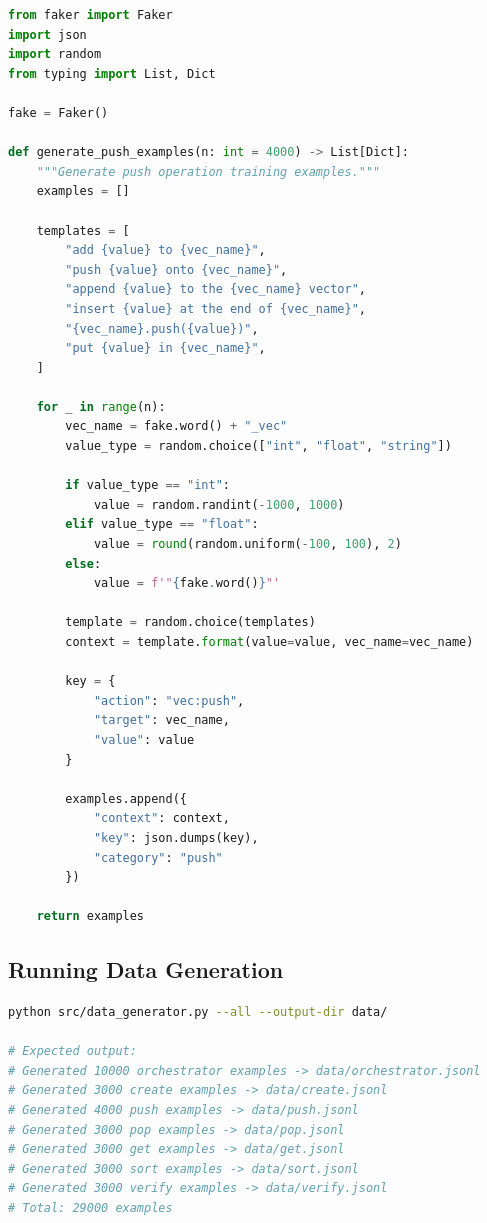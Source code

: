 \documentclass[11pt,a4paper]{article}
\begin{document}
\begin{lstlisting}[language=Python, caption={Data Generator Core}]
from faker import Faker
import json
import random
from typing import List, Dict

fake = Faker()

def generate_push_examples(n: int = 4000) -> List[Dict]:
    """Generate push operation training examples."""
    examples = []

    templates = [
        "add {value} to {vec_name}",
        "push {value} onto {vec_name}",
        "append {value} to the {vec_name} vector",
        "insert {value} at the end of {vec_name}",
        "{vec_name}.push({value})",
        "put {value} in {vec_name}",
    ]

    for _ in range(n):
        vec_name = fake.word() + "_vec"
        value_type = random.choice(["int", "float", "string"])

        if value_type == "int":
            value = random.randint(-1000, 1000)
        elif value_type == "float":
            value = round(random.uniform(-100, 100), 2)
        else:
            value = f'"{fake.word()}"'

        template = random.choice(templates)
        context = template.format(value=value, vec_name=vec_name)

        key = {
            "action": "vec:push",
            "target": vec_name,
            "value": value
        }

        examples.append({
            "context": context,
            "key": json.dumps(key),
            "category": "push"
        })

    return examples
\end{lstlisting}

\subsection{Running Data Generation}

\begin{lstlisting}[language=bash, caption={Generate All Data}]
python src/data_generator.py --all --output-dir data/

# Expected output:
# Generated 10000 orchestrator examples -> data/orchestrator.jsonl
# Generated 3000 create examples -> data/create.jsonl
# Generated 4000 push examples -> data/push.jsonl
# Generated 3000 pop examples -> data/pop.jsonl
# Generated 3000 get examples -> data/get.jsonl
# Generated 3000 sort examples -> data/sort.jsonl
# Generated 3000 verify examples -> data/verify.jsonl
# Total: 29000 examples
\end{lstlisting}
\end{document}
